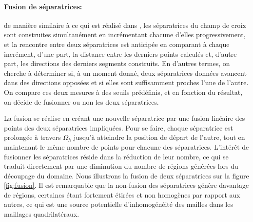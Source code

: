 \paragraph{Fusion de séparatrices:} 


de manière similaire à ce qui est réalisé dans \cite{marcon2019high}, les séparatrices du champ de croix sont construites simultanément en incrémentant chacune d'elles progressivement, et la rencontre entre deux séparatrices est anticipée en comparant à chaque incrément, d'une part, la distance entre les derniers points calculés et, d'autre part, les directions des derniers segments construits. En d'autres termes, on cherche à déterminer si, à un moment donné, deux séparatrices données avancent dans des directions opposées et si elles sont suffisamment proches l'une de l'autre. On compare ces deux mesures à des seuils prédéfinis, et en fonction du résultat, on décide de fusionner ou non les deux séparatrices.

La fusion se réalise en créant une nouvelle séparatrice par une fusion linéaire des points des deux séparatrices impliquées. Pour se faire, chaque séparatrice est prolongée à travers $\Omega_h$ jusqu'à atteindre la position de départ de l'autre, tout en maintenant le même nombre de points pour chacune des séparatrices. L'intérêt de fusionner les séparatrices réside dans la réduction de leur nombre, ce qui se traduit directement par une diminution du nombre de régions générées lors du découpage du domaine. Nous illustrons la fusion de deux séparatrices sur la figure \ref{fig:fusion}. Il est remarquable que la non-fusion des séparatrices génère davantage de régions, certaines étant fortement étirées et non homogènes par rapport aux autres, ce qui est une source potentielle d'inhomogénéité des mailles dans les maillages quadrilatéraux.


